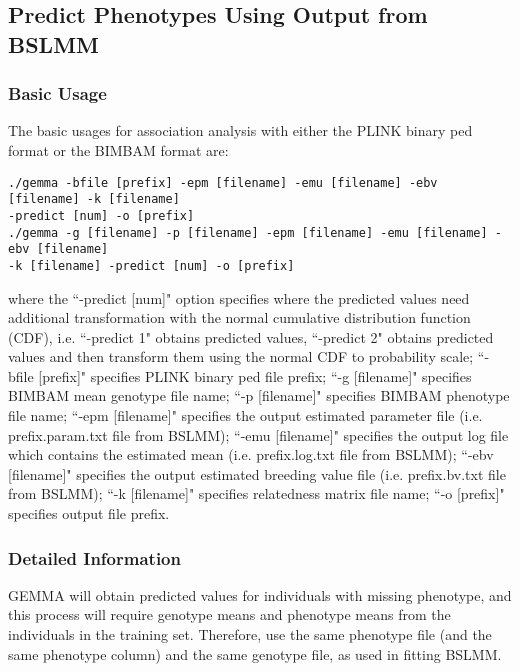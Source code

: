 \documentclass[11pt]{article}
\begin{document}
\subsection{Predict Phenotypes Using Output from BSLMM}
\subsubsection{Basic Usage}
The basic usages for association analysis with either the PLINK binary ped format or the BIMBAM format are:
\begin{verbatim}
./gemma -bfile [prefix] -epm [filename] -emu [filename] -ebv [filename] -k [filename] 
-predict [num] -o [prefix]
./gemma -g [filename] -p [filename] -epm [filename] -emu [filename] -ebv [filename] 
-k [filename] -predict [num] -o [prefix]
\end{verbatim}
where the ``-predict [num]" option specifies where the predicted values need additional transformation with the normal cumulative distribution function (CDF), i.e. ``-predict 1" obtains predicted values, ``-predict 2" obtains predicted values and then transform them using the normal CDF to probability scale; ``-bfile [prefix]" specifies PLINK binary ped file prefix; ``-g [filename]" specifies BIMBAM mean genotype file name; ``-p [filename]" specifies BIMBAM phenotype file name; ``-epm [filename]" specifies the output estimated parameter file (i.e. prefix.param.txt file from BSLMM); ``-emu [filename]" specifies the output log file which contains the estimated mean (i.e. prefix.log.txt file from BSLMM); ``-ebv [filename]" specifies the output estimated breeding value file (i.e. prefix.bv.txt file from BSLMM); ``-k [filename]" specifies relatedness matrix file name; ``-o [prefix]" specifies output file prefix. 


\subsubsection{Detailed Information}
GEMMA will obtain predicted values for individuals with missing phenotype, and this process will require genotype means and phenotype means from the individuals in the training set. Therefore, use the same phenotype file (and the same phenotype column) and the same genotype file, as used in fitting BSLMM. 
\end{document}
